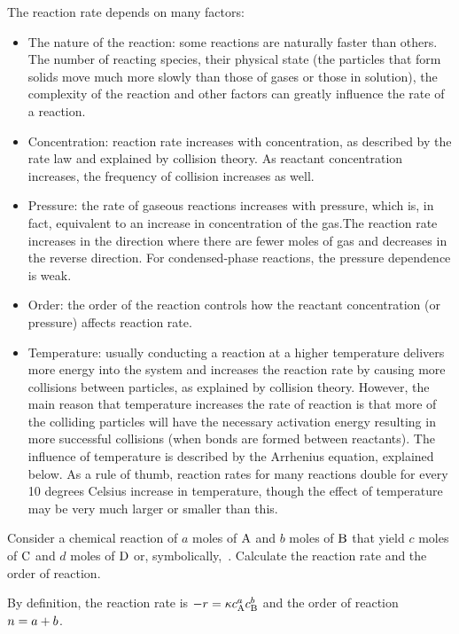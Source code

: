 The reaction rate depends on many factors:
\begin{itemize}
\item The nature of the reaction: some reactions are naturally faster than others. The number of reacting species, their physical state (the particles that form solids move much more slowly than those of gases or those in solution), the complexity of the reaction and other factors can greatly influence the rate of a reaction.
%
\item Concentration: reaction rate increases with concentration, as described by the rate law and explained by collision theory. As reactant concentration increases, the frequency of collision increases as well.
%
\item Pressure: the rate of gaseous reactions increases with pressure, which is, in fact, equivalent to an increase in concentration of the gas.The reaction rate increases in the direction where there are fewer moles of gas and decreases in the reverse direction. For condensed-phase reactions, the pressure dependence is weak.
%
\item Order: the order of the reaction controls how the reactant concentration (or pressure) affects reaction rate.
%
\item Temperature: usually conducting a reaction at a higher temperature delivers more energy into the system and increases the reaction rate by causing more collisions between particles, as explained by collision theory. However, the main reason that temperature increases the rate of reaction is that more of the colliding particles will have the necessary activation energy resulting in more successful collisions (when bonds are formed between reactants). The influence of temperature is described by the Arrhenius equation, explained below. As a rule of thumb, reaction rates for many reactions double for every 10 degrees Celsius increase in temperature, though the effect of temperature may be very much larger or smaller than this.
\end{itemize}

\begin{example}
Consider a chemical reaction of $a$ moles of $\ce A$ and $b$ moles of $\ce B$ that yield $c$ moles of $\ce C$ and $d$ moles of $\ce D$ or, symbolically,
\beq
{}\,.
\eeq
Calculate the reaction rate and the order of reaction.
\end{example}

\begin{solution}
By definition, the reaction rate is $-\rrate = \krcoeff\conc A^a\conc B^b$ and the order of reaction $n = a + b$.
\end{solution}

